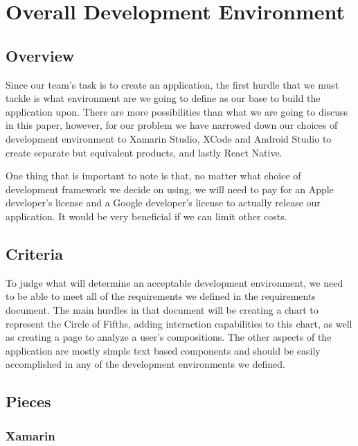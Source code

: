 \documentclass[onecolumn, draftclsnofoot,10pt, compsoc]{IEEEtran}
\begin{document}
\section{Overall Development Environment}
\subsection{Overview}

Since our team's task is to create an application, the first hurdle that we must tackle is what environment are we going to define as our base to build the application upon.
There are more possibilities than what we are going to discuss in this paper, however, for our problem we have narrowed down our choices of development environment to Xamarin Studio, XCode and Android Studio to create separate but equivalent products, and lastly React Native.

One thing that is important to note is that, no matter what choice of development framework we decide on using, we will need to pay for an Apple developer's license and a Google developer's license to actually release our application.
It would be very beneficial if we can limit other costs.


\subsection{Criteria}

To judge what will determine an acceptable development environment, we need to be able to meet all of the requirements we defined in the requirements document.
The main hurdles in that document will be creating a chart to represent the Circle of Fifths, adding interaction capabilities to this chart, as well as creating a page to analyze a user's compositions.
The other aspects of the application are mostly simple text based components and should be easily accomplished in any of the development environments we defined.

\subsection{Pieces}
\subsubsection{Xamarin}
\end{document}
